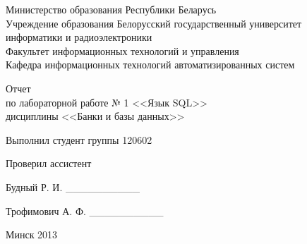 \thispagestyle{empty}
\setlength{\parindent}{0ex} %

\begin{center}
  Министерство образования Республики Беларусь \\
  \smallskip
  Учреждение образования Белорусский государственный университет \\
  информатики и радиоэлектроники \\
  \smallskip
  Факультет информационных технологий и управления \\
  \smallskip
  Кафедра информационных технологий автоматизированных систем \\
\end{center}

\vspace{60mm}

\begin{center}
Отчет \\
по лабораторной работе № 1 <<Язык SQL>> \\
дисциплины <<Банки и базы данных>>
\end{center}

\vspace{40mm}

\begin{minipage}{.5\linewidth}
    Выполнил студент группы 120602 

    \smallskip

    Проверил ассистент
\end{minipage}
\hfill
\begin{minipage}{.45\linewidth}
  \begin{flushright}
    Будный Р. И. \_\_\_\_\_\_\_\_\_\_

    \smallskip

    Трофимович А. Ф. \_\_\_\_\_\_\_\_\_\_
  \end{flushright}
\end{minipage}

\vspace{60mm}
\begin{center}
Минск 2013
\end{center}

\setlength{\parindent}{5ex} %

